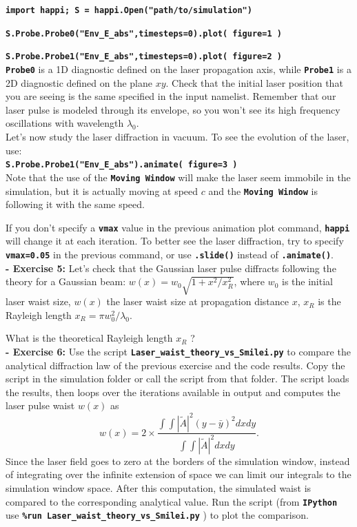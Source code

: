 \documentclass[a4paper,12pt]{extarticle}
\newcommand{\commandline}[1]{\texttt{\textbf{#1}}}
\begin{document}
\commandline{import happi; S =  happi.Open("path/to/simulation")}

\commandline{S.Probe.Probe0("Env\_E\_abs",timesteps=0).plot( figure=1 )}

\commandline{S.Probe.Probe1("Env\_E\_abs",timesteps=0).plot( figure=2 )}\\

\commandline{Probe0} is a 1D diagnostic defined on the laser propagation axis, while \commandline{Probe1} is a 2D diagnostic defined on the plane $xy$. Check that the initial laser position that you are seeing is the same specified in the input namelist. Remember that our laser pulse is modeled through its envelope, so you won't see its high frequency oscillations with wavelength $\lambda_0$.\\

Let's now study the laser diffraction in vacuum. To see the evolution of the laser, use:\\ 

\commandline{S.Probe.Probe1("Env\_E\_abs").animate( figure=3 )}\\

Note that the use of the \commandline{Moving Window} will make the laser seem immobile in the simulation, but it is actually moving at speed $c$ and the \commandline{Moving Window} is following it with the same speed.

If you don't specify a \commandline{vmax} value in the previous animation plot command, \commandline{happi} will change it at each iteration. To better see the laser diffraction, try to  specify \commandline{vmax=0.05} in the previous command, or use \commandline{.slide()} instead of \commandline{.animate()}.\\

\textbf{ - Exercise  5:} Let's check that the Gaussian laser pulse diffracts following the theory for a Gaussian beam: $w(x)=w_0\sqrt{1+x^2/x_R^2}$, where $w_0$ is the initial laser waist size, $w(x)$ the laser waist size at propagation distance $x$, $x_R$ is the Rayleigh length $x_R=\pi w_0^2/\lambda_0$. 

What is the theoretical Rayleigh length $x_R$ ?\\

\textbf{ - Exercise  6:} Use the script \commandline{Laser\_waist\_theory\_vs\_Smilei.py} to compare the analytical diffraction law of the previous exercise and the code results. Copy the script in the simulation folder or call the script from that folder. The script loads the results, then loops over the iterations available in output and computes the laser pulse waist $w(x)$ as 
\begin{equation}
w(x)=2\times\frac{\int\int|\tilde{A}|^2  (y-\bar{y})^2 dx dy}{\int\int |\tilde{A}|^2  dx dy}.
\end{equation} Since the laser field goes to zero at the borders of the simulation window, instead of integrating over the infinite extension of space we can limit our integrals to the simulation window space. After this computation, the simulated waist is compared to the corresponding analytical value. Run the script (from \commandline{IPython} use \commandline{\%run Laser\_waist\_theory\_vs\_Smilei.py} ) to plot the comparison.
\end{document}
